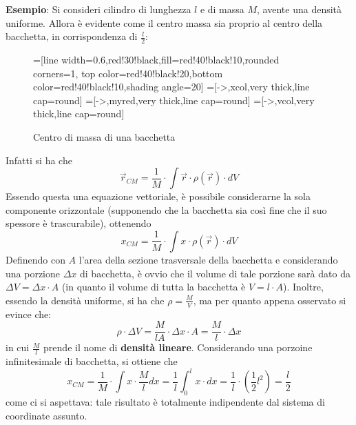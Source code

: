 \documentclass[a4paper]{extarticle}
\begin{document}
\vspace{1em}
\noindent
\textbf{Esempio}: Si consideri cilindro di lunghezza $l$ e di massa $M$, avente una densità uniforme. Allora è evidente come il centro massa sia proprio al centro della bacchetta, in corrispondenza di $\frac{l}{2}$:

\begin{figure}[H]
  \centering
  =[line width=0.6,red!30!black,fill=red!40!black!10,rounded corners=1,
                    top color=red!40!black!20,bottom color=red!40!black!10,shading angle=20]
  =[->,xcol,very thick,line cap=round]
  =[->,myred,very thick,line cap=round]
  =[->,vcol,very thick,line cap=round]
  \caption{Centro di massa di una bacchetta}
  \label{fig:centro_di_massa_bacchetta}
\end{figure}

\vspace{1em}
\noindent
Infatti si ha che
\[\vec r_{CM} = \frac{1}{M} \cdot \int \vec r \cdot \rho(\vec r) \cdot dV\]
Essendo questa una equazione vettoriale, è possibile considerarne la sola componente orizzontale (supponendo che la bacchetta sia così fine che il suo spessore è trascurabile), ottenendo
\[x_{CM}=\frac{1}{M} \cdot \int x \cdot \rho(\vec r) \cdot dV\]
Definendo con $A$ l'area della sezione trasversale della bacchetta e considerando una porzione $\Delta x$ di bacchetta, è ovvio che il volume di tale porzione sarà dato da $\Delta V = \Delta x \cdot A$ (in quanto il volume di tutta la bacchetta è $V=l \cdot A$). Inoltre, essendo la densità uniforme, si ha che $\rho = \frac{M}{V}$, ma per quanto appena osservato si evince che:
\[\rho \cdot \Delta V = \frac{M}{lA} \cdot \Delta x \cdot A = \frac{M}{l} \cdot \Delta x\]
in cui $\frac{M}{l}$ prende il nome di \textbf{densità lineare}. Considerando una porzoine infinitesimale di bacchetta, si ottiene che
\[x_{CM} = \frac{1}{M} \cdot \int x \cdot \frac{M}{l} dx = \frac{1}{l} \int_0^l x \cdot dx = \frac{1}{l} \cdot \left(\frac{1}{2}l^2\right) = \frac{l}{2}\]
come ci si aspettava: tale risultato è totalmente indipendente dal sistema di coordinate assunto.
\end{document}

